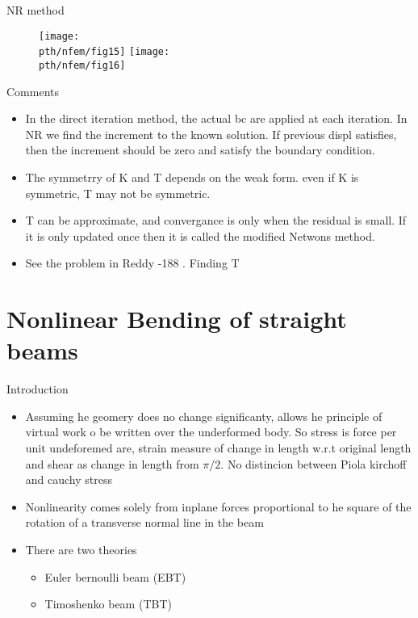 	\begin{frame}{NR method}
		\begin{figure}
			\centering
			\texttt{[image: \\pth/nfem/fig15]} 
			\texttt{[image: \\pth/nfem/fig16]} 		
		\end{figure}	
	\end{frame}


	\begin{frame}{Comments}
		\begin{itemize}
			\item In the direct iteration method, the actual bc are applied at each iteration. In NR we find the increment to the known solution. If previous displ satisfies, then the increment should be zero and satisfy the boundary condition. 
			\item The symmetrry of K and T depends on the weak form. even if K is symmetric, T may not be symmetric.
			\item T can be approximate, and convergance is only when the residual is small. If it is only updated once then it is called the modified Netwons method.
			\item See the problem in Reddy -188 . Finding T	
		\end{itemize}
	\end{frame}


\section{Nonlinear Bending of straight beams}
	\begin{frame}{Introduction}
		\begin{itemize}
			\item Assuming he geomery does no change significanty, allows he principle of virtual work o be written over the underformed body. So stress is force per unit undeforemed are, strain measure of change in length w.r.t original length and shear as change in length from $\pi/2$. No distincion between Piola kirchoff and cauchy stress
			\item Nonlinearity comes solely from inplane forces proportional to he square of the rotation of a transverse normal line in the beam
			\item There are two theories
				\begin{itemize}
					\item Euler bernoulli beam (EBT)
					\item Timoshenko beam (TBT)
					
				\end{itemize}
		\end{itemize}
	\end{frame}


